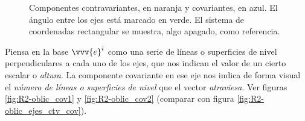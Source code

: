\begin{figure}[ht]
\begin{minipage}{0.45\linewidth}
    \caption{Componentes contravariantes, en naranja y covariantes, en azul. El ángulo
      entre los ejes está marcado en verde. El sistema de coordenadas rectangular se
      muestra, algo apagado, como referencia.}
    \label{fig:R2-oblic_contrav_cov}
  \end{minipage}
\end{figure}
Piensa en la base $\vvv{e}^i$ como una serie de líneas o superficies de nivel perpendiculares a cada uno de los ejes, que nos indican el valor de un cierto escalar o \emph{altura}. La componente covariante en ese eje nos indica de forma visual el
\emph{número de líneas o superficies de nivel} que el vector \emph{atraviesa}.
Ver figuras \ref{fig:R2-oblic_cov1} y \ref{fig:R2-oblic_cov2} (comparar con figura
\ref{fig:R2-oblic_ejes_ctv_cov}).

